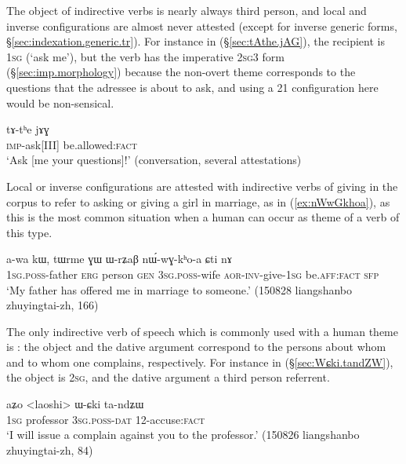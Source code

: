 The object of indirective verbs is nearly always third person, and local and inverse configurations are almost never attested (except for inverse generic forms, §\ref{sec:indexation.generic.tr}). For instance in (§\ref{sec:tAthe.jAG}), the recipient is \textsc{1sg} (`ask me'), but the verb  has the imperative \textsc{2sg}\fl{}3 form (§\ref{sec:imp.morphology}) because the non-overt theme corresponds to the questions that the adressee is about to ask, and using a 2\fl{}1 configuration here would be non-sensical.

\begin{exe}
	\ex \label{sec:tAthe.jAG}
	\gll  tɤ-tʰe jɤɣ \\
	\textsc{imp}-ask[III] be.allowed:\textsc{fact} \\
	\glt `Ask [me your questions]!' (conversation, several attestations)
\end{exe}

Local or inverse configurations are attested with indirective verbs of giving in the corpus to refer to asking or giving a girl in marriage, as in (\ref{ex:nWwGkhoa}), as this is the most common situation when a human can occur as theme of a verb of this type.

\begin{exe}
	\ex \label{ex:nWwGkhoa}
	\gll  a-wa kɯ, tɯrme ɣɯ ɯ-rʑaβ nɯ́-wɣ-kʰo-a ɕti nɤ \\
	\textsc{1sg}.\textsc{poss}-father \textsc{erg} person \textsc{gen} \textsc{3sg}.\textsc{poss}-wife \textsc{aor}-\textsc{inv}-give-\textsc{1sg} be.\textsc{aff}:\textsc{fact} \textsc{sfp} \\
	\glt `My father has offered me in marriage to someone.' (150828 liangshanbo zhuyingtai-zh, 166)
\end{exe}

The only indirective verb of speech which is commonly used with a human theme is : the object and the dative argument correspond to the persons about whom and to whom one complains, respectively. For instance in (§\ref{sec:Wɕki.tandZW}), the object is \textsc{2sg}, and the dative argument a third person referrent.

\begin{exe}
	\ex \label{sec:Wɕki.tandZW}
	\gll  aʑo <laoshi> ɯ-ɕki ta-ndʑɯ \\
	\textsc{1sg} professor \textsc{3sg}.\textsc{poss}-\textsc{dat} 1\fl{}2-accuse:\textsc{fact} \\
	\glt `I will issue a complain against you to the professor.' (150826 liangshanbo zhuyingtai-zh, 84)
\end{exe}

